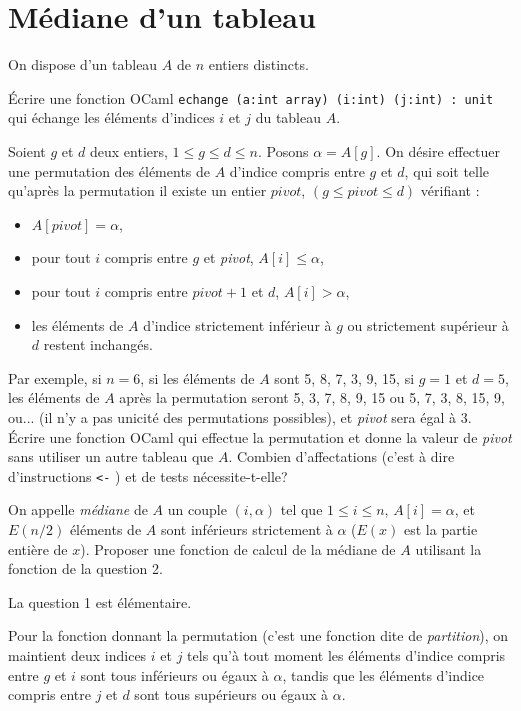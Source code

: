 \renewcommand{\SourceFile}{1-parcours-de-tableaux/src/1-2.ml}

\vspace{16pt}
\section{Médiane d'un tableau}

On dispose d'un tableau $A$ de $n$ entiers distincts.

\Q
Écrire une fonction OCaml \texttt{echange (a:int array) (i:int) (j:int) : unit} qui échange les éléments d'indices $i$ et $j$ du tableau $A$.

\Q
Soient $g$ et $d$ deux entiers, $1\leq g\leq d \leq n$. Posons $\alpha=A[g]$. On désire effectuer une permutation des éléments de $A$ d'indice compris entre $g$ et $d$, qui soit telle qu'après la permutation il existe un entier $pivot$, $(g\leq pivot \leq d)$ vérifiant :

\begin{itemize}
    \item $A[\textit{pivot}]=\alpha$,
    \item pour tout $i$ compris entre $g$ et \textit{pivot}, $A[i]\leq\alpha$,
    \item pour tout $i$ compris entre $\textit{pivot}+1$ et $d$, $A[i]>\alpha$,
    \item les éléments de $A$ d'indice strictement inférieur à $g$ ou strictement supérieur à $d$ restent inchangés.
\end{itemize}

Par exemple, si $n=6$, si les éléments de $A$ sont 5, 8, 7, 3, 9, 15, si $g=1$ et $d=5$, les éléments de $A$ après la permutation seront 5, 3, 7, 8, 9, 15 ou 5, 7, 3, 8, 15, 9, ou... (il n'y a pas unicité des permutations possibles), et \textit{pivot} sera égal à 3. Écrire une fonction OCaml qui effectue la permutation et donne la valeur de \textit{pivot} sans utiliser un autre tableau que $A$. Combien d'affectations (c'est à dire d'instructions \og \texttt{<-} \fg) et de tests nécessite-t-elle?

\Q
On appelle \textit{médiane} de $A$ un couple $(i,\alpha)$ tel que $1\leq i\leq n$, $A[i]=\alpha$, et $E(n/2)$ éléments de $A$ sont inférieurs strictement à $\alpha$ ($E(x)$ est la partie entière de $x$). Proposer une fonction de calcul de la médiane de $A$ utilisant la fonction de la question 2.

\Corrige
\Q
La question 1 est élémentaire.

\Q
Pour la fonction donnant la permutation (c'est une fonction dite de \textit{partition}), on maintient deux indices $i$ et $j$ tels qu'à tout moment les éléments d'indice compris entre $g$ et $i$ sont tous inférieurs ou égaux à $\alpha$, tandis que les éléments d'indice compris entre $j$ et $d$ sont tous supérieurs ou égaux à $\alpha$.

